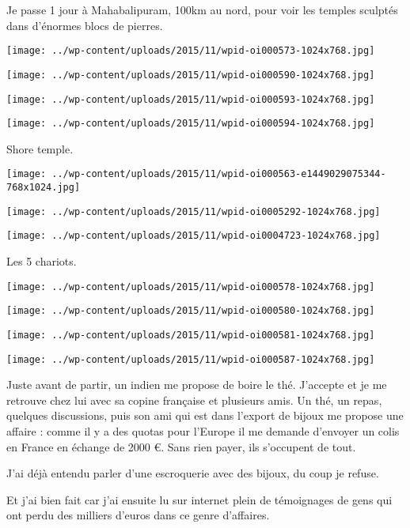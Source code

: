 \pagebreak
 Je passe 1 jour à Mahabalipuram, 100km au nord, pour voir les temples sculptés dans d'énormes blocs de pierres. 
\begin{center} \texttt{[image: ../wp-content/uploads/2015/11/wpid-oi000573-1024x768.jpg]} \end{center}
\begin{center} \texttt{[image: ../wp-content/uploads/2015/11/wpid-oi000590-1024x768.jpg]} \end{center}
\begin{center} \texttt{[image: ../wp-content/uploads/2015/11/wpid-oi000593-1024x768.jpg]} \end{center}
\begin{center} \texttt{[image: ../wp-content/uploads/2015/11/wpid-oi000594-1024x768.jpg]} \end{center}

\pagebreak
 Shore temple. 
\begin{center} \texttt{[image: ../wp-content/uploads/2015/11/wpid-oi000563-e1449029075344-768x1024.jpg]} \end{center} 
\begin{center} \texttt{[image: ../wp-content/uploads/2015/11/wpid-oi0005292-1024x768.jpg]} \end{center}
\begin{center} \texttt{[image: ../wp-content/uploads/2015/11/wpid-oi0004723-1024x768.jpg]} \end{center}

 Les 5 chariots. 
\begin{center} \texttt{[image: ../wp-content/uploads/2015/11/wpid-oi000578-1024x768.jpg]} \end{center}
\begin{center} \texttt{[image: ../wp-content/uploads/2015/11/wpid-oi000580-1024x768.jpg]} \end{center}
\begin{center} \texttt{[image: ../wp-content/uploads/2015/11/wpid-oi000581-1024x768.jpg]} \end{center}
\begin{center} \texttt{[image: ../wp-content/uploads/2015/11/wpid-oi000587-1024x768.jpg]} \end{center}

 Juste avant de partir, un indien me propose de boire le thé. J'accepte et je me retrouve chez lui avec sa copine française et plusieurs amis. Un thé, un repas, quelques discussions, puis son ami qui est dans l'export de bijoux me propose une affaire : comme il y a des quotas pour l'Europe il me demande d'envoyer un colis en France en échange de 2000 €. Sans rien payer, ils s'occupent de tout. 

 J'ai déjà entendu parler d'une escroquerie avec des bijoux, du coup je refuse. 

 Et j'ai bien fait car j'ai ensuite lu sur internet plein de témoignages de gens qui ont perdu des milliers d'euros dans ce genre d'affaires.